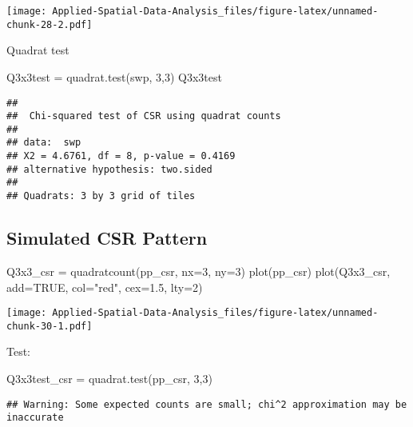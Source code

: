 \documentclass[
]{book}
\newenvironment{Shaded}{\begin{snugshade}}{\end{snugshade}}
\newcommand{\AttributeTok}[1]{\textcolor[rgb]{0.77,0.63,0.00}{#1}}
\newcommand{\ConstantTok}[1]{\textcolor[rgb]{0.00,0.00,0.00}{#1}}
\newcommand{\DecValTok}[1]{\textcolor[rgb]{0.00,0.00,0.81}{#1}}
\newcommand{\FloatTok}[1]{\textcolor[rgb]{0.00,0.00,0.81}{#1}}
\newcommand{\FunctionTok}[1]{\textcolor[rgb]{0.00,0.00,0.00}{#1}}
\newcommand{\NormalTok}[1]{#1}
\newcommand{\OtherTok}[1]{\textcolor[rgb]{0.56,0.35,0.01}{#1}}
\newcommand{\StringTok}[1]{\textcolor[rgb]{0.31,0.60,0.02}{#1}}
\begin{document}
\texttt{[image: Applied-Spatial-Data-Analysis\_files/figure-latex/unnamed-chunk-28-2.pdf]}

Quadrat test

\begin{Shaded}
\begin{Highlighting}[]
\NormalTok{Q3x3test }\OtherTok{=} \FunctionTok{quadrat.test}\NormalTok{(swp, }\DecValTok{3}\NormalTok{,}\DecValTok{3}\NormalTok{)}
\NormalTok{Q3x3test}
\end{Highlighting}
\end{Shaded}

\begin{verbatim}
## 
##  Chi-squared test of CSR using quadrat counts
## 
## data:  swp
## X2 = 4.6761, df = 8, p-value = 0.4169
## alternative hypothesis: two.sided
## 
## Quadrats: 3 by 3 grid of tiles
\end{verbatim}

\hypertarget{simulated-csr-pattern}{%
\subsection{Simulated CSR Pattern}\label{simulated-csr-pattern}}

\begin{Shaded}
\begin{Highlighting}[]
\NormalTok{Q3x3\_csr }\OtherTok{=} \FunctionTok{quadratcount}\NormalTok{(pp\_csr, }\AttributeTok{nx=}\DecValTok{3}\NormalTok{, }\AttributeTok{ny=}\DecValTok{3}\NormalTok{)}
\FunctionTok{plot}\NormalTok{(pp\_csr)}
\FunctionTok{plot}\NormalTok{(Q3x3\_csr, }\AttributeTok{add=}\ConstantTok{TRUE}\NormalTok{, }\AttributeTok{col=}\StringTok{"red"}\NormalTok{, }\AttributeTok{cex=}\FloatTok{1.5}\NormalTok{, }\AttributeTok{lty=}\DecValTok{2}\NormalTok{)}
\end{Highlighting}
\end{Shaded}

\texttt{[image: Applied-Spatial-Data-Analysis\_files/figure-latex/unnamed-chunk-30-1.pdf]}

Test:

\begin{Shaded}
\begin{Highlighting}[]
\NormalTok{Q3x3test\_csr }\OtherTok{=} \FunctionTok{quadrat.test}\NormalTok{(pp\_csr, }\DecValTok{3}\NormalTok{,}\DecValTok{3}\NormalTok{)}
\end{Highlighting}
\end{Shaded}

\begin{verbatim}
## Warning: Some expected counts are small; chi^2 approximation may be inaccurate
\end{verbatim}
\end{document}
